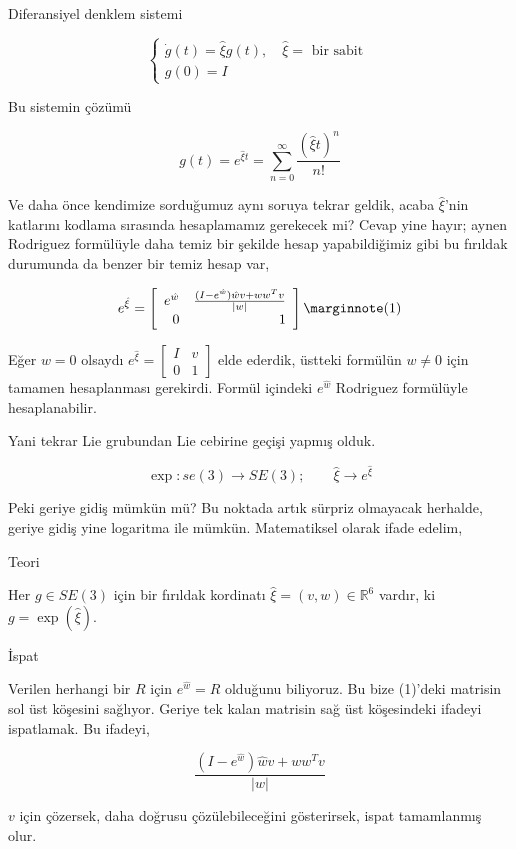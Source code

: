 \documentclass[12pt,fleqn]{article}\usepackage{../../common}
\begin{document}
Diferansiyel denklem sistemi

$$ \left\{ \begin{array}{ll}
\dot{g}(t) = \hat{\xi}g(t), \quad \hat{\xi} = \textrm{ bir sabit } \\
g(0) = I
\end{array} \right. $$

Bu sistemin çözümü

$$ 
g(t) = e^{\hat{\xi} t} = \sum _{n=0}^{\infty} \frac{(\hat{\xi} t)^n}{n!}
 $$

Ve daha önce kendimize sorduğumuz aynı soruya tekrar geldik, acaba
$\hat{\xi}$'nin katlarını kodlama sırasında hesaplamamız gerekecek mi?
Cevap yine hayır; aynen Rodriguez formülüyle daha temiz bir şekilde hesap
yapabildiğimiz gibi bu fırıldak durumunda da benzer bir temiz hesap var,

$$ e^{\hat{\xi}} = 
\left[\begin{array}{rrr}
e^{\hat{w}} & \frac{(I-e^{\hat{w}}) \hat{w}v + ww^Tv}{|w|} \\
0 & 1
\end{array}\right]
\mlabel{1}
$$

Eğer $w = 0$ olsaydı $e^{\hat{\xi}}=\left[\begin{array}{rrr} I & v\\0 & 1\end{array}\right]$ 
elde ederdik, üstteki formülün $w \ne 0$ için tamamen hesaplanması
gerekirdi.  Formül içindeki $e^{\hat{w}}$ Rodriguez formülüyle hesaplanabilir.

Yani tekrar Lie grubundan Lie cebirine geçişi yapmış olduk. 

$$ \exp: se(3) \to SE(3); \qquad \hat{\xi} \to e^{\hat{\xi}} $$

Peki geriye gidiş mümkün mü? Bu noktada artık sürpriz olmayacak herhalde,
geriye gidiş yine logaritma ile mümkün. Matematiksel olarak ifade edelim, 

Teori 

Her $g \in SE(3)$ için bir fırıldak kordinatı $\hat{\xi}=(v,w) \in
\mathbb{R}^6$ vardır, ki $g = \exp(\hat{\xi})$. 

İspat

Verilen herhangi bir $R$ için $e^{\hat{w}} = R$ olduğunu biliyoruz. Bu bize
(1)'deki matrisin sol üst köşesini sağlıyor. Geriye tek kalan matrisin sağ
üst köşesindeki ifadeyi ispatlamak. Bu ifadeyi, 

$$ \frac{(I-e^{\hat{w}}) \hat{w}v + ww^Tv}{|w|} $$

$v$ için çözersek, daha doğrusu çözülebileceğini gösterirsek, ispat
tamamlanmış olur. 
\end{document}
